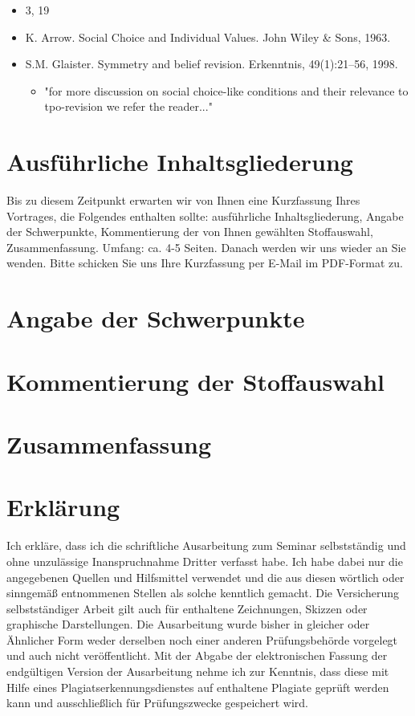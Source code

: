 \documentclass[11pt]{article}
\begin{document}
\begin{itemize}
\begin{itemize}
        \item 3, 19
        \item K. Arrow. Social Choice and Individual Values. John Wiley & Sons, 1963.
        \item S.M. Glaister. Symmetry and belief revision. Erkenntnis, 49(1):21–56, 1998.
        \begin{itemize}
            \item "for more discussion on social choice-like conditions and their relevance to tpo-revision we refer the reader..."
        \end{itemize}
    \end{itemize}
\end{itemize}

\section{Ausführliche Inhaltsgliederung}
Bis zu diesem Zeitpunkt erwarten wir von Ihnen eine Kurzfassung Ihres Vortrages, die  Folgendes enthalten sollte: ausführliche Inhaltsgliederung, Angabe der Schwerpunkte, Kommentierung der von Ihnen gewählten Stoffauswahl, Zusammenfassung. Umfang: ca. 4-5 Seiten. Danach werden wir uns wieder an Sie wenden. Bitte schicken Sie uns Ihre Kurzfassung per E-Mail im PDF-Format zu.
\section{Angabe der Schwerpunkte}
\section{Kommentierung der Stoffauswahl}
\section{Zusammenfassung}

\newpage

\section{Erklärung}
Ich erkläre, dass ich die schriftliche Ausarbeitung zum Seminar selbstständig und ohne unzulässige Inanspruchnahme Dritter verfasst habe. Ich habe dabei nur die angegebenen Quellen und Hilfsmittel verwendet und die aus diesen wörtlich oder sinngemäß entnommenen Stellen als solche kenntlich gemacht. Die Versicherung selbstständiger Arbeit gilt auch für enthaltene Zeichnungen, Skizzen oder graphische Darstellungen. Die Ausarbeitung wurde bisher in gleicher oder Ähnlicher Form weder derselben noch einer anderen Prüfungsbehörde vorgelegt und auch nicht veröffentlicht. Mit der Abgabe der elektronischen Fassung der endgültigen Version der Ausarbeitung nehme ich zur Kenntnis, dass diese mit Hilfe eines Plagiatserkennungsdienstes auf enthaltene Plagiate geprüft werden kann und ausschließlich für Prüfungszwecke gespeichert wird.
\end{document}
